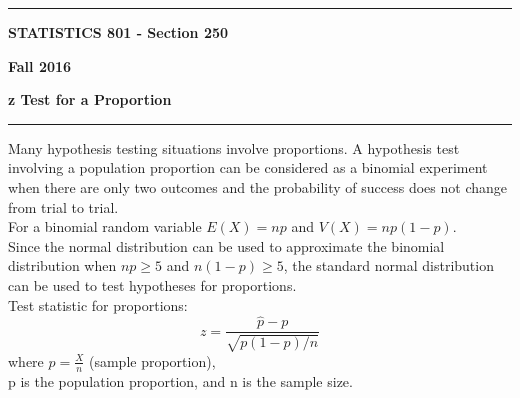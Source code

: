 \documentclass[12pt]{article}
\begin{document}
\hrule
\medskip
\centerline{\textbf{STATISTICS 801 - Section 250}}\hfill \textbf{Fall 2016}
\centerline{\textbf{z Test for a Proportion}}
\smallskip
\hrule
Many hypothesis testing situations involve proportions. A hypothesis test involving a population proportion can be considered as a binomial experiment when there are only two outcomes and the probability of success does not change from trial to trial.\\
For a binomial random variable $E(X)=np$ and $V(X)=np(1-p)$.\\
Since the normal distribution can be used to approximate the binomial distribution when $np\geq 5$ and $n(1-p)\geq 5$, the standard normal distribution can be used to test hypotheses for proportions.\\
Test statistic for proportions:\\
\begin{equation}
z=\frac{\hat{p}-p}{\sqrt{p(1-p)/n}}
\end{equation}
where $\hat{p}=\frac{X}{n}$ (sample proportion),\\
p is the population proportion, and n is the sample size.
\end{document}

